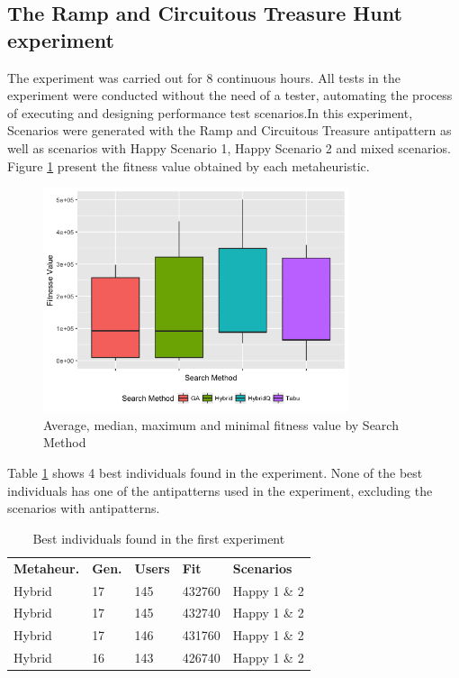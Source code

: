 \documentclass{report}
\begin{document}
\subsection{The Ramp and Circuitous Treasure Hunt experiment}

The experiment was carried out for 8 continuous hours.  All tests in the experiment were conducted without the need of a tester, automating the process of executing and designing performance test scenarios.In this experiment, Scenarios were generated with the Ramp and Circuitous Treasure antipattern as well as scenarios with Happy Scenario 1, Happy Scenario 2 and mixed scenarios. Figure \ref{fig:boxplot1} present the fitness value obtained by each metaheuristic.

\begin{figure}[h]
\begin{minipage}{.5\textwidth}
\centering
\includegraphics[width=0.8\textwidth]{./images/experiment1-4.png}
\caption{Average, median, maximum and minimal fitness value by Search Method}
\label{fig:boxplot1}
\end{minipage}
\end{figure}

Table \ref{tab:bestindividuals} shows 4 best individuals found in the experiment. None of the best individuals has one of the antipatterns used in the experiment, excluding the scenarios with antipatterns. 

\begin{table}[h]
\centering
\caption{Best individuals found in the first experiment}
\label{tab:bestindividuals}
\begin{tabular}{lllll}
\rowcolor[HTML]{C0C0C0} 
\textbf{Metaheur.} & \textbf{Gen.} & \textbf{Users} & \textbf{Fit} & \textbf{Scenarios}  \\
Hybrid & 17 & 145 & 432760 & Happy 1 \& 2  \\
Hybrid & 17 & 145 & 432740 & Happy 1 \& 2   \\
Hybrid & 17 & 146 & 431760 & Happy 1 \& 2  \\
Hybrid & 16 & 143 & 426740 & Happy 1 \& 2  
\end{tabular}
\end{table}
\end{document}
